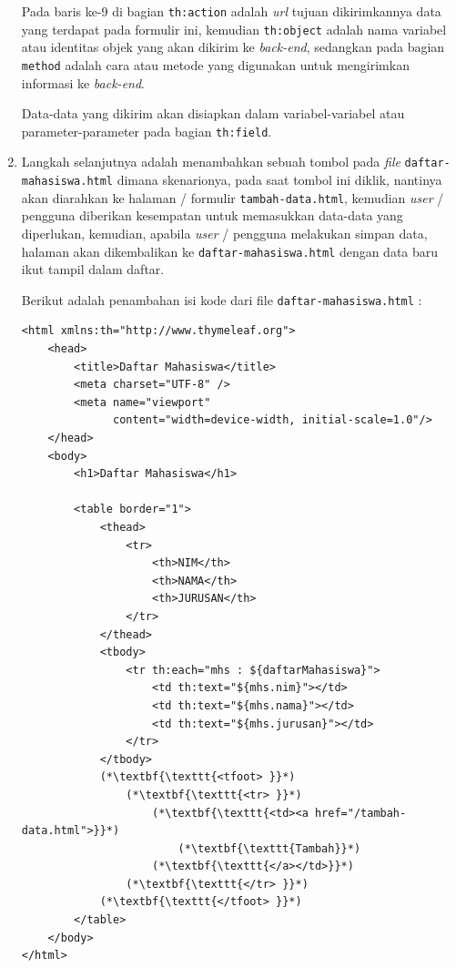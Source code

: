 \begin{enumerate}
	Pada baris ke-9 di bagian \texttt{th:action} adalah \textit{url} tujuan dikirimkannya data yang terdapat pada formulir ini, kemudian \texttt{th:object} adalah nama variabel atau identitas objek yang akan dikirim ke \textit{back-end}, sedangkan pada bagian \texttt{method} adalah cara atau metode yang digunakan untuk mengirimkan informasi ke \textit{back-end}. 
	
	Data-data yang dikirim akan disiapkan dalam variabel-variabel atau parameter-parameter pada bagian \texttt{th:field}.
	
	\item Langkah selanjutnya adalah menambahkan sebuah tombol pada \textit{file} \texttt{daftar-mahasiswa.html} dimana skenarionya, pada saat tombol ini diklik, nantinya akan diarahkan ke halaman / formulir \texttt{tambah-data.html}, kemudian \textit{user} / pengguna diberikan kesempatan untuk memasukkan data-data yang diperlukan, kemudian, apabila \textit{user} / pengguna melakukan simpan data, halaman akan dikembalikan ke \texttt{daftar-mahasiswa.html} dengan data baru ikut tampil dalam daftar.
	
	Berikut adalah penambahan isi kode dari file \texttt{daftar-mahasiswa.html} :
	
	\begin{lstlisting}
<html xmlns:th="http://www.thymeleaf.org">
    <head>
        <title>Daftar Mahasiswa</title>
        <meta charset="UTF-8" />
        <meta name="viewport" 
              content="width=device-width, initial-scale=1.0"/>
    </head>
    <body>
        <h1>Daftar Mahasiswa</h1>
        
        <table border="1">
            <thead>
                <tr>
                    <th>NIM</th>
                    <th>NAMA</th>
                    <th>JURUSAN</th>
                </tr>
            </thead>
            <tbody>
                <tr th:each="mhs : ${daftarMahasiswa}">
                    <td th:text="${mhs.nim}"></td>
                    <td th:text="${mhs.nama}"></td>
                    <td th:text="${mhs.jurusan}"></td>
                </tr>
            </tbody>
            (*\textbf{\texttt{<tfoot> }}*)
                (*\textbf{\texttt{<tr> }}*)
                    (*\textbf{\texttt{<td><a href="/tambah-data.html">}}*)
                        (*\textbf{\texttt{Tambah}}*)
                    (*\textbf{\texttt{</a></td>}}*)
                (*\textbf{\texttt{</tr> }}*)
            (*\textbf{\texttt{</tfoot> }}*)
        </table>
    </body>
</html>
	\end{lstlisting}
	

\end{enumerate}
